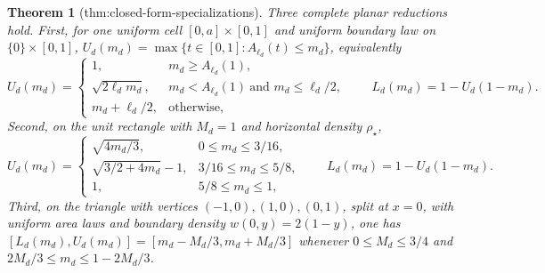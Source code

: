 \documentclass{article}
\newtheorem{theorem}{Theorem}
\begin{document}
\begin{theorem}[thm:closed-form-specializations]\label{thm:closed-form-specializations}
Three complete planar reductions hold. First, for one uniform cell \([0,a]\times[0,1]\) and uniform boundary law on \(\{0\}\times[0,1]\), \(U_d(m_d)=\max\{t\in[0,1]:A_{\ell_d}(t)\le m_d\}\), equivalently \[U_d(m_d)=\begin{cases}1,&m_d\ge A_{\ell_d}(1),\\ \sqrt{2\ell_dm_d},&m_d<A_{\ell_d}(1)\ \text{and }m_d\le\ell_d/2,\\ m_d+\ell_d/2,&\text{otherwise},\end{cases}\qquad L_d(m_d)=1-U_d(1-m_d).\] Second, on the unit rectangle with \(M_d=1\) and horizontal density \(\rho_\star\), \[U_d(m_d)=\begin{cases}\sqrt{4m_d/3},&0\le m_d\le3/16,\\ \sqrt{3/2+4m_d}-1,&3/16\le m_d\le5/8,\\1,&5/8\le m_d\le1,\end{cases}\qquad L_d(m_d)=1-U_d(1-m_d).\] Third, on the triangle with vertices \((-1,0),(1,0),(0,1)\), split at \(x=0\), with uniform area laws and boundary density \(w(0,y)=2(1-y)\), one has \([L_d(m_d),U_d(m_d)]=[m_d-M_d/3,m_d+M_d/3]\) whenever \(0\le M_d\le3/4\) and \(2M_d/3\le m_d\le1-2M_d/3\).
\end{theorem}
\end{document}
